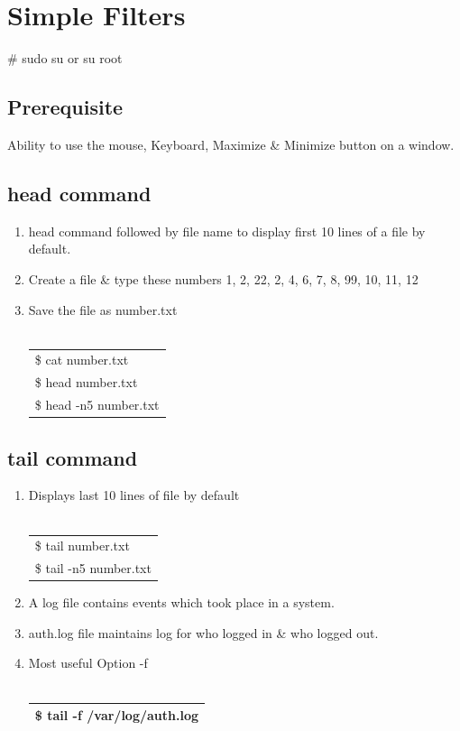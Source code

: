 \documentclass[12pt, a4paper]{report}
\begin{document}
\chapter{Simple Filters}
\# sudo su or su root
\section{Prerequisite}
Ability to use the mouse, Keyboard, Maximize \& Minimize button on a window.
\section{head command}
\begin{enumerate}
\item head command followed by file name to display first 10 lines of a file by default.
\item Create a file \& type these numbers 1, 2, 22, 2, 4, 6, 7, 8, 99, 10, 11, 12
\item Save the file as number.txt\\
\\
\begin{tabular}{|l|}\hline
\$ cat number.txt\\
\$ head number.txt\\
\$ head -n5 number.txt\\ \hline
\end{tabular}
\end{enumerate}
\section{tail command}
\begin{enumerate}
\item Displays last 10 lines of file by default\\
\\
\begin{tabular}{|l|}\hline
\$ tail number.txt\\
\$ tail -n5 number.txt\\ \hline
\end{tabular}
\item A log file contains events which took place in a system.
\item auth.log file maintains log for who logged in \& who logged out.
\item Most useful Option -f\\
\\
\begin{tabular}{|l|}\hline
\$ tail -f /var/log/auth.log\\ \hline
\end{tabular}
\end{enumerate}
\end{document}
